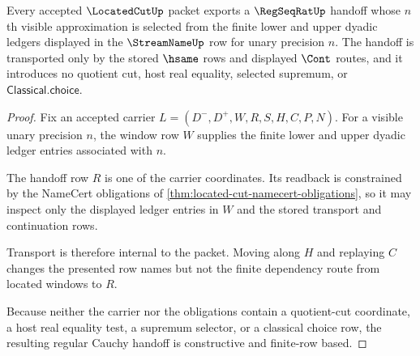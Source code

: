 \begin{theorem}
\label{thm:located-cut-regular-cauchy-handoff}
Every accepted $\LocatedCutUp$ packet exports a $\RegSeqRatUp$ handoff whose $n$th visible approximation is selected from the finite lower and upper dyadic ledgers displayed in the $\StreamNameUp$ row for unary precision $n$. The handoff is transported only by the stored $\hsame$ rows and displayed $\Cont$ routes, and it introduces no quotient cut, host real equality, selected supremum, or $\mathsf{Classical.choice}$.
\end{theorem}
\begin{proof}
Fix an accepted carrier $L=(D^{-},D^{+},W,R,S,H,C,P,N)$. For a visible unary precision $n$, the window row $W$ supplies the finite lower and upper dyadic ledger entries associated with $n$.

The handoff row $R$ is one of the carrier coordinates. Its readback is constrained by the NameCert obligations of \autoref{thm:located-cut-namecert-obligations}, so it may inspect only the displayed ledger entries in $W$ and the stored transport and continuation rows.

Transport is therefore internal to the packet. Moving along $H$ and replaying $C$ changes the presented row names but not the finite dependency route from located windows to $R$.

Because neither the carrier nor the obligations contain a quotient-cut coordinate, a host real equality test, a supremum selector, or a classical choice row, the resulting regular Cauchy handoff is constructive and finite-row based.
\end{proof}

